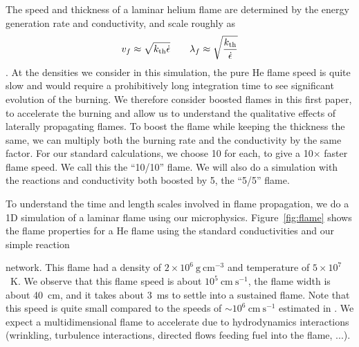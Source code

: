 \documentclass[preprint,times,tighten]{aastex63}
\newcommand{\kth}{k_{\rm th}}
\newcommand{\gcc}{\mathrm{g~cm^{-3} }}
\newcommand{\cms}{\mathrm{cm~s^{-1} }}
\newcommand{\MarginPar}[1]{
    \marginpar{\vskip-\baselineskip%
               \raggedright%
               \tiny\sffamily%
               {\color{red}\hrule%
               \smallskip%
               #1\par%
               \smallskip%
               \hrule}}%
}
\newcommand{\AssignTo}[1]{
    \marginpar{\vskip-\baselineskip%
               \raggedright%
               \tiny\sffamily%
               {\color{blue}\hrule%
               \smallskip%
               #1\par%
               \smallskip%
               \hrule}}%
}
\begin{document}
The speed and thickness of a laminar helium flame are determined by the
energy generation rate and conductivity, and scale roughly as
\begin{equation}
\label{eq:flame_scaling}
v_f \approx \sqrt{\kth \dot{\epsilon}} \qquad
\lambda_f \approx \sqrt{\frac{\kth}{\dot{\epsilon}}}
\end{equation}
\citep{orourke:1979,khokhlov:1993}.
At the densities we consider in this simulation, the pure He flame
speed is quite slow and would require a prohibitively long integration
time to see significant evolution of the burning.  We therefore
consider boosted flames in this first paper, to accelerate the burning
and allow us to understand the qualitative effects of laterally
propagating flames.  To boost the flame while keeping the thickness
the same, we can multiply both the burning rate and the conductivity
by the same factor.  For our standard calculations, we choose 10 for
each, to give a 10$\times$ faster flame speed.  We call this the ``10/10''
flame.  We will also do a simulation with the reactions and
conductivity both boosted by 5, the ``5/5'' flame.

To understand the time and length scales involved in flame
propagation, we do a 1D simulation of a laminar flame using our
microphysics.  Figure~\ref{fig:flame} shows the flame properties for a 
He flame using the standard conductivities and our simple reaction \MarginPar{standard?  this is a boosted flame, right?}
network.  This flame had a density of $2\times 10^6~\gcc$ and 
temperature of $5\times 10^7$~K.  We observe that this flame speed is
about $10^5~\cms$, the flame width is about 40~cm, and it
takes about 3~ms to settle into a sustained flame.  Note that this speed
is quite small compared to the speeds of $\sim 10^6~\cms$ estimated in
\citet{spitkovsky2002}.  We expect a multidimensional flame to
accelerate due to hydrodynamics interactions (wrinkling, turbulence
interactions, directed flows feeding fuel into the flame, ...).


\begin{figure*}[t]
\caption{\label{fig:flame} Time-evolution of the 10$\times$ boosted 1D
	laminar flame. The left plot shows temperature and nuclear energy
	generation profiles at 11 different times, while the right plot
	shows flame propagation speed and flame thickness as functions of time.}
\end{figure*}
\end{document}
